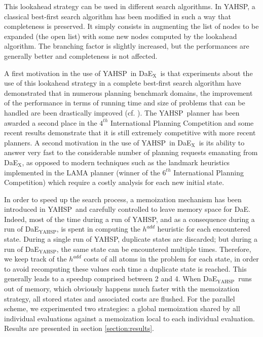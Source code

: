 \documentclass{sig-alternate}
\newcommand{\DAE}{{\sc DaE}}
\newcommand{\DAEX}{{\sc DaE$_{\text{X}}$}}
\newcommand{\DAEYAHSP}{{\sc DaE$_{\text{YAHSP}}$}}
\newcommand{\YAHSP}{{\sc YAHSP}}
\begin{document}
This lookahead strategy can be used in different search algorithms. In \YAHSP,
a classical best-first search algorithm has been modified in such a way that
completeness is preserved. It simply consists in augmenting the list of nodes
to be expanded (the open list) with some new nodes computed by the lookahead
algorithm. The branching factor is slightly increased, but the performances are
generally better and completeness is not affected.

A first motivation in the use of \YAHSP\ in \DAEX\ is that experiments about the
use of this lookahead strategy in a complete best-first search algorithm have
demonstrated that in numerous planning benchmark domains, the improvement of the
performance in terms of running time and size of problems that can be handled
are been drastically improved (cf. \cite{yahsp:icaps2004}). The \YAHSP\ planner
has been awarded a second place in the $4^{th}$ International Planning Competition
\cite{ipc4:jair05} and some recent results \cite{rintanen:acai2010} demonstrate
that it is still extremely competitive with more recent planners. A second
motivation in the use of \YAHSP\ in \DAEX\ is its ability to answer very fast to
the considerable number of planning requests emanating from \DAEX, as opposed to
modern techniques such as the landmark heuristics implemented in the LAMA
planner \cite{lama:jair2010} (winner of the $6^{th}$ International Planning
Competition) which require a costly analysis for each new initial state.

In order to speed up the search process, a memoization mechanism has been introduced in
\YAHSP\ and carefully controlled to leave memory space for \DAE. Indeed, most of
the time during a run of \YAHSP, and as a consequence during a run of \DAEYAHSP,
is spent in computing the $h^{add}$ heuristic for each encountered state. During a single run of YAHSP, duplicate states are discarded; but during a run of \DAEYAHSP, the same state can be encountered
multiple times. Therefore, we keep track of the $h^{add}$ costs of all atoms in
the problem for each state, in order to avoid recomputing these values each time
a duplicate state is reached. This generally leads to a speedup comprised
between 2 and 4. When \DAEYAHSP\ runs out of memory, which obviously happens
much faster with the memoization strategy, all stored states and associated
costs are flushed.
For the parallel scheme, we experimented two strategies: a global memoization shared by all individual evaluations against a memoization local to each individual evaluation. 
Results are presented in section \ref{section:results}.
\end{document}
